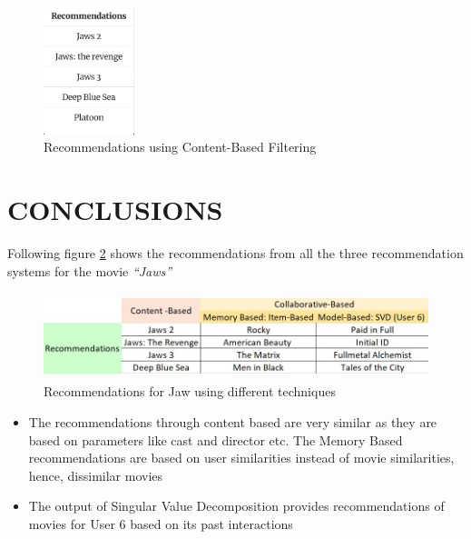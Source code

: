\documentclass[a4paper,10pt]{article}
\begin{document}
\begin{itemize}
\begin{figure}[H]
        
        \centering
        \includegraphics[height=3.7cm]{figures/Content(output).png}
        \caption{Recommendations using Content-Based Filtering}
        \label{recommend(content)}
\end{figure}

\end{itemize}

\section{CONCLUSIONS}
Following figure \ref{conclude} shows the recommendations from all the three recommendation systems for the movie \textit{“Jaws”}

\begin{figure}[H]
        
        \centering
        \includegraphics[height=2.5cm]{figures/conclude.jpg}
        \caption{Recommendations for Jaw using different techniques}
        \label{conclude}
\end{figure}

\begin{itemize}
    \item The recommendations through content based are very similar as they are based on parameters like cast and director etc. The Memory Based recommendations are based on user similarities instead of movie similarities, hence, dissimilar movies
    \item The output of Singular Value Decomposition provides recommendations of movies for User 6 based on its past interactions 


\end{itemize}
\end{document}
